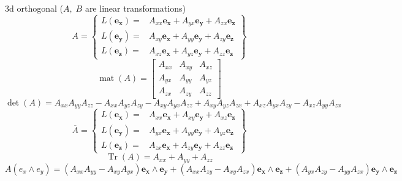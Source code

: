 \documentclass[10pt,fleqn]{report}
\DeclareMathOperator{\Tr}{Tr}
\newcommand{\lp}{\left (}
\newcommand{\rp}{\right )}
\newcommand{\W}{\wedge}
\newcommand{\f}[2]{{#1}\lp{#2}\rp}
\begin{document}
3d orthogonal ($A,\;B$ are linear transformations)
\begin{equation*} A = \left \{ \begin{array}{ll} L \left ( \boldsymbol{e_{x}}\right ) =& A_{xx} \boldsymbol{e_{x}} + A_{yx} \boldsymbol{e_{y}} + A_{zx} \boldsymbol{e_{z}} \\ L \left ( \boldsymbol{e_{y}}\right ) =& A_{xy} \boldsymbol{e_{x}} + A_{yy} \boldsymbol{e_{y}} + A_{zy} \boldsymbol{e_{z}} \\ L \left ( \boldsymbol{e_{z}}\right ) =& A_{xz} \boldsymbol{e_{x}} + A_{yz} \boldsymbol{e_{y}} + A_{zz} \boldsymbol{e_{z}}  \end{array} \right \} \end{equation*}
\begin{equation*} \f{\operatorname{mat}}{A} = \left[\begin{matrix}A_{xx} & A_{xy} & A_{xz}\\A_{yx} & A_{yy} & A_{yz}\\A_{zx} & A_{zy} & A_{zz}\end{matrix}\right] \end{equation*}
\begin{equation*} \f{\det}{A} = A_{xx} A_{yy} A_{zz} - A_{xx} A_{yz} A_{zy} - A_{xy} A_{yx} A_{zz} + A_{xy} A_{yz} A_{zx} + A_{xz} A_{yx} A_{zy} - A_{xz} A_{yy} A_{zx} \end{equation*}
\begin{equation*} \overline{A} = \left \{ \begin{array}{ll} L \left ( \boldsymbol{e_{x}}\right ) =& A_{xx} \boldsymbol{e_{x}} + A_{xy} \boldsymbol{e_{y}} + A_{xz} \boldsymbol{e_{z}} \\ L \left ( \boldsymbol{e_{y}}\right ) =& A_{yx} \boldsymbol{e_{x}} + A_{yy} \boldsymbol{e_{y}} + A_{yz} \boldsymbol{e_{z}} \\ L \left ( \boldsymbol{e_{z}}\right ) =& A_{zx} \boldsymbol{e_{x}} + A_{zy} \boldsymbol{e_{y}} + A_{zz} \boldsymbol{e_{z}}  \end{array} \right \} \end{equation*}
\begin{equation*} \f{\Tr}{A} = A_{xx} + A_{yy} + A_{zz} \end{equation*}
\begin{equation*} \f{A}{e_x\W e_y} = \left ( A_{xx} A_{yy} - A_{xy} A_{yx}\right ) \boldsymbol{e_{x}\wedge e_{y}} + \left ( A_{xx} A_{zy} - A_{xy} A_{zx}\right ) \boldsymbol{e_{x}\wedge e_{z}} + \left ( A_{yx} A_{zy} - A_{yy} A_{zx}\right ) \boldsymbol{e_{y}\wedge e_{z}} \end{equation*}
\end{document}
